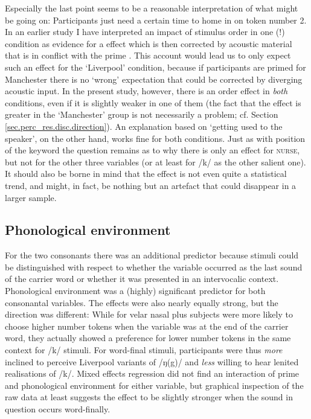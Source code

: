 Especially the last point seems to be a reasonable interpretation of what might be going on: Participants just need a certain time to home in on token number 2.
In an earlier study I have interpreted an impact of stimulus order in one (!) condition as evidence for a  effect which is then corrected by acoustic material that is in conflict with the prime \parencite{juskanma}.
This account would lead us to only expect such an effect for the `Liverpool' condition, because if participants are primed for Manchester there is no `wrong' expectation that could be corrected by diverging acoustic input.
In the present study, however, there is an order effect in \emph{both} conditions, even if it is slightly weaker in one of them (the fact that the effect is greater in the `Manchester' group is not necessarily a problem; cf. Section \ref{sec.perc_res.disc.direction}).
An explanation based on `getting used to the speaker', on the other hand, works fine for both conditions.
Just as with position of the keyword the question remains as to why there is only an effect for \textsc{nurse}, but not for the other three variables (or at least for /k/ as the other salient one).
It should also be borne in mind that the effect is not even quite a statistical trend, and might, in fact, be nothing but an artefact that could disappear in a larger sample.

		\subsection{Phonological environment}

For the two consonants there was an additional predictor because stimuli could be distinguished with respect to whether the variable occurred as the last sound of the carrier word or whether it was presented in an intervocalic context.
Phonological environment was a (highly) significant predictor for both consonantal variables.
The effects were also nearly equally strong, but the direction was different: While for velar nasal plus subjects were more likely to choose higher number tokens when the variable was at the end of the carrier word, they actually showed a preference for lower number tokens in the same context for /k/ stimuli.
For word-final stimuli, participants were thus \emph{more} inclined to perceive Liverpool variants of /ŋ(g)/ and \emph{less} willing to hear lenited realisations of /k/.
Mixed effects regression did not find an interaction of prime and phonological environment for either variable, but graphical inspection of the raw data at least suggests the  effect to be slightly stronger when the sound in question occurs word-finally.

